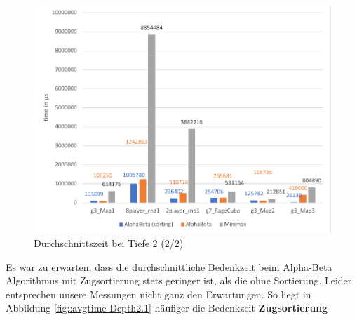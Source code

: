 \begin{figure}[h]
	\begin{center}
		\includegraphics{Depth_2_2_avgtime.pdf}
		\caption{Durchschnittszeit bei Tiefe 2 (2/2)}
		\label{fig::avgtime Depth 2.2}
	\end{center}
\end{figure}
Es war zu erwarten, dass die durchschnittliche Bedenkzeit beim Alpha-Beta Algorithmus mit Zugsortierung stets geringer ist, als die ohne Sortierung. Leider entsprechen unsere Messungen nicht ganz den Erwartungen. So liegt in Abbildung \ref{fig::avgtime Depth2.1} häufiger die Bedenkzeit \textbf{Zugsortierung}

